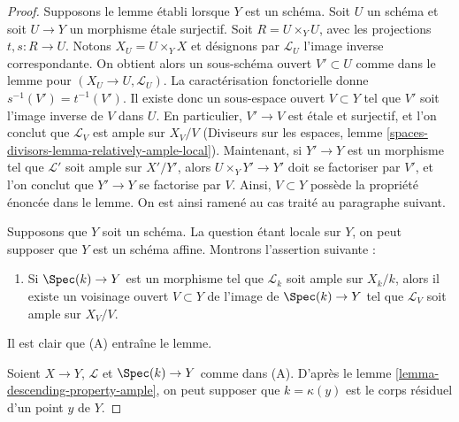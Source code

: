 \begin{proof}
Supposons le lemme établi lorsque $Y$ est un schéma.
Soit $U$ un schéma et soit $U \to Y$ un morphisme \'etale surjectif.
Soit $R = U \times_Y U$, avec les projections $t, s : R \to U$.
Notons $X_U = U \times_Y X$ et désignons par $\mathcal{L}_U$ l'image inverse correspondante.
On obtient alors un sous-schéma ouvert $V' \subset U$ comme dans le lemme
pour $(X_U \to U, \mathcal{L}_U)$. La caractérisation fonctorielle donne
$s^{-1}(V') = t^{-1}(V')$.
Il existe donc un sous-espace ouvert $V \subset Y$ tel que
$V'$ soit l'image inverse de $V$ dans $U$.
En particulier, $V' \to V$ est \'etale et surjectif, et l'on
conclut que $\mathcal{L}_V$ est ample sur $X_V/V$
(Diviseurs sur les espaces, lemme \ref{spaces-divisors-lemma-relatively-ample-local}).
Maintenant, si $Y' \to Y$ est un morphisme tel que
$\mathcal{L}'$ soit ample sur $X'/Y'$, alors
$U \times_Y Y' \to Y'$ doit se factoriser par $V'$,
et l'on conclut que $Y' \to Y$ se factorise par $V$.
Ainsi, $V \subset Y$ possède la propriété énoncée dans le lemme.
On est ainsi ramené au cas traité au
paragraphe suivant.

\medskip\noindent
Supposons que $Y$ soit un schéma. La question étant locale sur $Y$,
on peut supposer que $Y$ est un schéma affine. Montrons
l'assertion suivante :
\begin{enumerate}
\item[(A)] Si $\Spec(k) \to Y$ est un morphisme tel que
$\mathcal{L}_k$ soit ample sur $X_k/k$, alors il existe un
voisinage ouvert $V \subset Y$ de l'image de $\Spec(k) \to Y$
tel que $\mathcal{L}_V$ soit ample sur $X_V/V$.
\end{enumerate}
Il est clair que (A) entraîne le lemme.

\medskip\noindent
Soient $X \to Y$, $\mathcal{L}$ et $\Spec(k) \to Y$ comme dans (A).
D'après le lemme \ref{lemma-descending-property-ample},
on peut supposer que $k = \kappa(y)$ est le corps résiduel d'un point $y$
de $Y$.


\end{proof}

